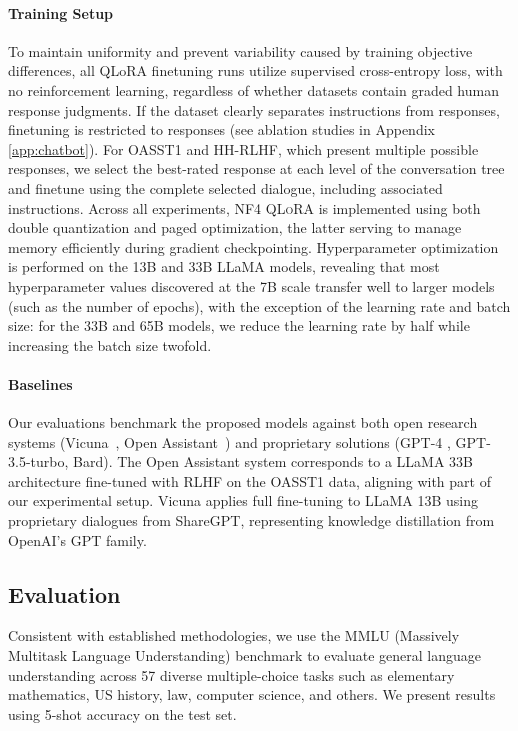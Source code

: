 \paragraph{Training Setup} To maintain uniformity and prevent variability caused by training objective differences, all QLoRA finetuning runs utilize supervised cross-entropy loss, with no reinforcement learning, regardless of whether datasets contain graded human response judgments. If the dataset clearly separates instructions from responses, finetuning is restricted to responses (see ablation studies in Appendix \ref{app:chatbot}). For OASST1 and HH-RLHF, which present multiple possible responses, we select the best-rated response at each level of the conversation tree and finetune using the complete selected dialogue, including associated instructions. Across all experiments, NF4 \textsc{QLoRA} is implemented using both double quantization and paged optimization, the latter serving to manage memory efficiently during gradient checkpointing. Hyperparameter optimization is performed on the 13B and 33B LLaMA models, revealing that most hyperparameter values discovered at the 7B scale transfer well to larger models (such as the number of epochs), with the exception of the learning rate and batch size: for the 33B and 65B models, we reduce the learning rate by half while increasing the batch size twofold.

\paragraph{Baselines} Our evaluations benchmark the proposed models against both open research systems (Vicuna~\citep{vicuna2023}, Open Assistant~\citep{kopf2023openassistant}) and proprietary solutions (GPT-4 \citep{openai2023gpt}, GPT-3.5-turbo, Bard). The Open Assistant system corresponds to a LLaMA 33B architecture fine-tuned with RLHF on the OASST1 data, aligning with part of our experimental setup. Vicuna applies full fine-tuning to LLaMA 13B using proprietary dialogues from ShareGPT, representing knowledge distillation from OpenAI’s GPT family.

\subsection{Evaluation}

Consistent with established methodologies, we use the MMLU (Massively Multitask Language Understanding) benchmark \citep{hendrycksmeasuring} to evaluate general language understanding across 57 diverse multiple-choice tasks such as elementary mathematics, US history, law, computer science, and others. We present results using 5-shot accuracy on the test set.


